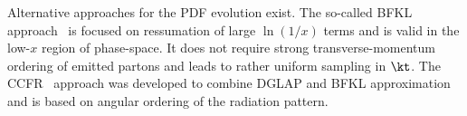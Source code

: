 Alternative approaches for the PDF evolution exist. The so-called BFKL approach~\cite{Balitsky:1978,Kuraev:1977fs} is focused on ressumation of large $\ln{\left(1/x\right)}$ terms and is valid in the low-$x$ region of phase-space. It does not require strong transverse-momentum ordering of emitted partons and leads to rather uniform sampling in $\kt$. The CCFR~\cite{Ciafaloni:1987ur,Catani:1989sg,Catani:1989yc,Martin:1996by} approach was developed to combine DGLAP and BFKL approximation and is based on angular ordering of the radiation pattern.